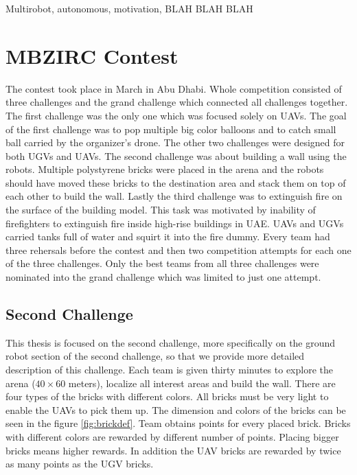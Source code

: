 Multirobot, autonomous, motivation, BLAH BLAH BLAH


\section{MBZIRC Contest}
The contest took place in March in Abu Dhabi. Whole competition consisted of three challenges and the grand challenge which connected all challenges together. The first challenge was the only one which was focused solely on UAVs. The goal of the first challenge was to pop multiple big color balloons and to catch small ball carried by the organizer's drone. The other two challenges were designed for both UGVs and UAVs. The second challenge was about building a wall using the robots. Multiple polystyrene bricks were placed in the arena and the robots should have moved these bricks to the destination area and stack them on top of each other to build the wall. Lastly the third challenge was to extinguish fire on the surface of the building model. This task was motivated by inability of firefighters to extinguish fire inside high-rise buildings in UAE. UAVs and UGVs carried tanks full of water and squirt it into the fire dummy. Every team had three rehersals before the contest and then two competition attempts for each one of the three challenges. Only the best teams from all three challenges were nominated into the grand challenge which was limited to just one attempt.

\subsection{Second Challenge}
This thesis is focused on the second challenge, more specifically on the ground robot section of the second challenge, so that we provide more detailed description of this challenge. Each team is given thirty minutes to explore the arena ($40 \times 60$ meters), localize all interest areas and build the wall. There are four types of the bricks with different colors. All bricks must be very light to enable the UAVs to pick them up. The dimension and colors of the bricks can be seen in the figure \ref{fig:brickdef}. Team obtains points for every placed brick. Bricks with different colors are rewarded by different number of points. Placing bigger bricks means higher rewards. In addition the UAV bricks are rewarded by twice as many points as the UGV bricks.

